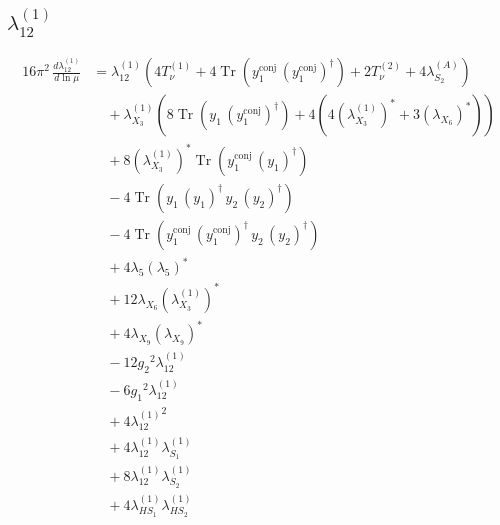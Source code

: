 \documentclass[10pt,a4paper]{article}
\begin{document}
\subsection*{$\lambda_{12}^{(1)}$}
\begin{align*}
16\pi^2\,\frac{d \lambda_{12}^{(1)}}{d\ln\mu} &={\lambda_{12}^{(1)}} (4 T_{\nu}^{(1)}+4 \operatorname{Tr}\!\left({y_{1}^{\mathrm{conj}}}\,\left({y_{1}^{\mathrm{conj}}}\right)^{\dagger}\right)+2 T_{\nu}^{(2)}+4 {\lambda_{S_2}^{(A)}}) \\
&\quad +{\lambda_{X_{3}}^{(1)}} (8 \operatorname{Tr}\!\left({y_1}\,\left({y_{1}^{\mathrm{conj}}}\right)^{\dagger}\right)+4 (4 \left({\lambda_{X_{3}}^{(1)}}\right)^{*}+3 \left({\lambda_{X_{6}}}\right)^{*})) \\
&\quad +8 \left({\lambda_{X_{3}}^{(1)}}\right)^{*} \operatorname{Tr}\!\left({y_{1}^{\mathrm{conj}}}\,\left({y_1}\right)^{\dagger}\right) \\
&\quad -4 \operatorname{Tr}\!\left({y_1}\,\left({y_1}\right)^{\dagger}\,{y_2}\,\left({y_2}\right)^{\dagger}\right) \\
&\quad -4 \operatorname{Tr}\!\left({y_{1}^{\mathrm{conj}}}\,\left({y_{1}^{\mathrm{conj}}}\right)^{\dagger}\,{y_2}\,\left({y_2}\right)^{\dagger}\right) \\
&\quad +4 {\lambda_5} \left({\lambda_5}\right)^{*} \\
&\quad +12 {\lambda_{X_{6}}} \left({\lambda_{X_{3}}^{(1)}}\right)^{*} \\
&\quad +4 {\lambda_{X_{9}}} \left({\lambda_{X_{9}}}\right)^{*} \\
&\quad -12 {g_2}^2 {\lambda_{12}^{(1)}} \\
&\quad -6 {g_1}^2 {\lambda_{12}^{(1)}} \\
&\quad +4 {\lambda_{12}^{(1)}}^2 \\
&\quad +4 {\lambda_{12}^{(1)}} {\lambda_{S_1}^{(1)}} \\
&\quad +8 {\lambda_{12}^{(1)}} {\lambda_{S_2}^{(1)}} \\
&\quad +4 {\lambda_{HS_1}^{(1)}} {\lambda_{HS_2}^{(1)}} \\
\end{align*}
\end{document}
